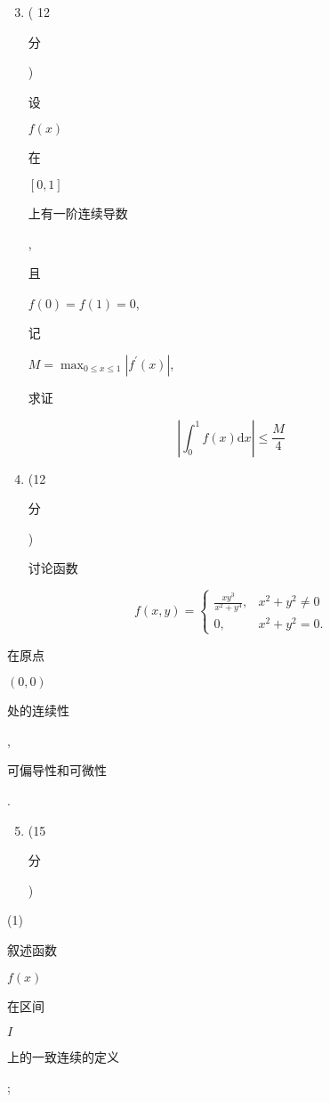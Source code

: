 \documentclass[10pt]{article}
\begin{document}
\begin{enumerate}
  \setcounter{enumi}{2}
  \item ( 12 \begin{CJK}{UTF8}{mj}分\end{CJK}) \begin{CJK}{UTF8}{mj}设\end{CJK} $f(x)$ \begin{CJK}{UTF8}{mj}在\end{CJK} $[0,1]$ \begin{CJK}{UTF8}{mj}上有一阶连续导数\end{CJK}, \begin{CJK}{UTF8}{mj}且\end{CJK} $f(0)=f(1)=0$, \begin{CJK}{UTF8}{mj}记\end{CJK} $M=\max _{0 \leqslant x \leqslant 1}\left|f^{\prime}(x)\right|$, \begin{CJK}{UTF8}{mj}求证\end{CJK}
\end{enumerate}
$$
\left|\int_{0}^{1} f(x) \mathrm{d} x\right| \leqslant \frac{M}{4}
$$

\begin{enumerate}
  \setcounter{enumi}{3}
  \item (12 \begin{CJK}{UTF8}{mj}分\end{CJK}) \begin{CJK}{UTF8}{mj}讨论函数\end{CJK}
\end{enumerate}
$$
f(x, y)= \begin{cases}\frac{x y^{3}}{x^{2}+y^{4}}, & x^{2}+y^{2} \neq 0 \\ 0, & x^{2}+y^{2}=0 .\end{cases}
$$
\begin{CJK}{UTF8}{mj}在原点\end{CJK} $(0,0)$ \begin{CJK}{UTF8}{mj}处的连续性\end{CJK}, \begin{CJK}{UTF8}{mj}可偏导性和可微性\end{CJK}.

\begin{enumerate}
  \setcounter{enumi}{4}
  \item (15 \begin{CJK}{UTF8}{mj}分\end{CJK})
\end{enumerate}
(1)\begin{CJK}{UTF8}{mj}叙述函数\end{CJK} $f(x)$ \begin{CJK}{UTF8}{mj}在区间\end{CJK} $I$ \begin{CJK}{UTF8}{mj}上的一致连续的定义\end{CJK};
\end{document}
